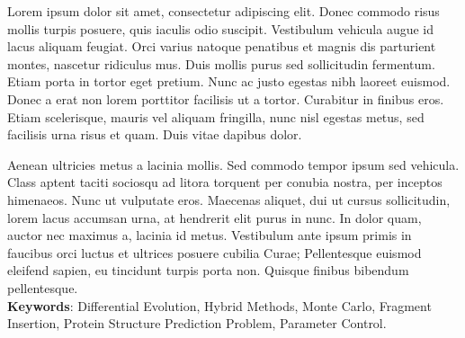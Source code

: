 \begin{resumo}
  Lorem ipsum dolor sit amet, consectetur adipiscing elit. Donec commodo risus mollis turpis posuere, quis iaculis odio suscipit. Vestibulum vehicula augue id lacus aliquam feugiat. Orci varius natoque penatibus et magnis dis parturient montes, nascetur ridiculus mus. Duis mollis purus sed sollicitudin fermentum. Etiam porta in tortor eget pretium. Nunc ac justo egestas nibh laoreet euismod. Donec a erat non lorem porttitor facilisis ut a tortor. Curabitur in finibus eros. Etiam scelerisque, mauris vel aliquam fringilla, nunc nisl egestas metus, sed facilisis urna risus et quam. Duis vitae dapibus dolor.

  Aenean ultricies metus a lacinia mollis. Sed commodo tempor ipsum sed vehicula. Class aptent taciti sociosqu ad litora torquent per conubia nostra, per inceptos himenaeos. Nunc ut vulputate eros. Maecenas aliquet, dui ut cursus sollicitudin, lorem lacus accumsan urna, at hendrerit elit purus in nunc. In dolor quam, auctor nec maximus a, lacinia id metus. Vestibulum ante ipsum primis in faucibus orci luctus et ultrices posuere cubilia Curae; Pellentesque euismod eleifend sapien, eu tincidunt turpis porta non. Quisque finibus bibendum pellentesque.
  \\
  \vspace{\onelineskip}
  \noindent
  \textbf{Keywords}: Differential Evolution, Hybrid Methods, Monte Carlo, Fragment Insertion, Protein Structure Prediction Problem, Parameter Control.
\end{resumo}



